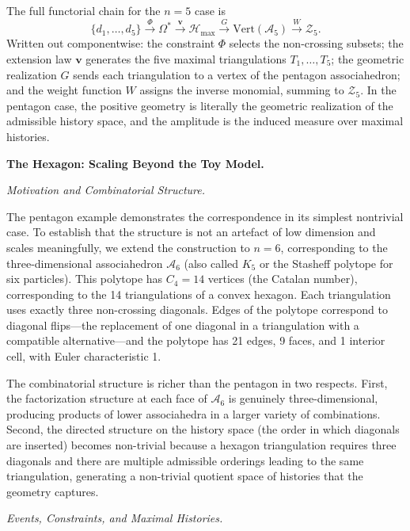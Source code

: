 \documentclass[12pt, oneside]{amsart}
\theoremstyle{plain}
\theoremstyle{definition}
\theoremstyle{remark}
\newcommand{\Phif}{\Phi}
\newcommand{\OmKS}{\Omega}
\newcommand{\Hmax}{\mathcal{H}_{\max}}
\begin{document}
The full functorial chain for the $n=5$ case is
\begin{equation}
\label{eq:composite-map}
  \{d_1,\ldots,d_5\} \xrightarrow{\Phif} \OmKS^* \xrightarrow{\mathbf{v}} \Hmax \xrightarrow{G} \mathrm{Vert}(\mathcal{A}_5) \xrightarrow{W} \mathcal{Z}_5.
\end{equation}
Written out componentwise: the constraint $\Phif$ selects the non-crossing subsets; the extension law $\mathbf{v}$ generates the five maximal triangulations $T_1, \ldots, T_5$; the geometric realization $G$ sends each triangulation to a vertex of the pentagon associahedron; and the weight function $W$ assigns the inverse monomial, summing to $\mathcal{Z}_5$. In the pentagon case, the positive geometry is literally the geometric realization of the admissible history space, and the amplitude is the induced measure over maximal histories.

\bigskip\noindent\textbf{The Hexagon: Scaling Beyond the Toy Model.}
\label{sec:hexagon}

\medskip\noindent\textit{Motivation and Combinatorial Structure.}

The pentagon example demonstrates the correspondence in its simplest nontrivial case. To establish that the structure is not an artefact of low dimension and scales meaningfully, we extend the construction to $n = 6$, corresponding to the three-dimensional associahedron $\mathcal{A}_6$ (also called $K_5$ or the Stasheff polytope for six particles). This polytope has $C_4 = 14$ vertices (the Catalan number), corresponding to the 14 triangulations of a convex hexagon. Each triangulation uses exactly three non-crossing diagonals. Edges of the polytope correspond to diagonal flips---the replacement of one diagonal in a triangulation with a compatible alternative---and the polytope has 21 edges, 9 faces, and 1 interior cell, with Euler characteristic 1.

The combinatorial structure is richer than the pentagon in two respects. First, the factorization structure at each face of $\mathcal{A}_6$ is genuinely three-dimensional, producing products of lower associahedra in a larger variety of combinations. Second, the directed structure on the history space (the order in which diagonals are inserted) becomes non-trivial because a hexagon triangulation requires three diagonals and there are multiple admissible orderings leading to the same triangulation, generating a non-trivial quotient space of histories that the geometry captures.

\medskip\noindent\textit{Events, Constraints, and Maximal Histories.}
\end{document}
